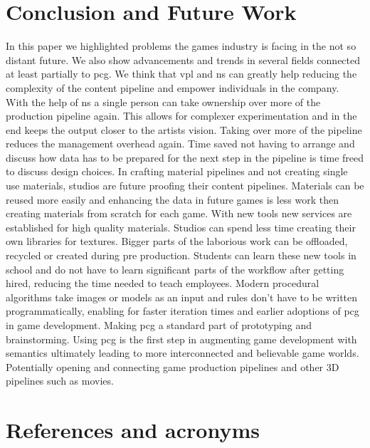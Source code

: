\documentclass[10pt,a4paper]{article}
\begin{document}
\section{Conclusion and Future Work}
\begin{multicols}{2}
In this paper we highlighted problems the games industry is facing in the not so distant future. We also show advancements and trends in several fields connected at least partially to \gls{pcg}. We think that \gls{vpl} and \gls{ns} can greatly help reducing the complexity of the content pipeline and empower individuals in the company. With the help of \gls{ns} a single person can take ownership over more of the production pipeline again. This allows for complexer experimentation and in the end keeps the output closer to the artists vision. Taking over more of the pipeline reduces the management overhead again. Time saved not having to arrange and discuss how data has to be prepared for the next step in the pipeline is time freed to discuss design choices. In crafting material pipelines and not creating single use materials, studios are future proofing their content pipelines. Materials can be reused more easily and enhancing the data in future games is less work then creating materials from scratch for each game. With new tools new services are established for high quality materials. Studios can spend less time creating their own libraries for textures. Bigger parts of the laborious work can be offloaded, recycled or created during pre production. Students can learn these new tools in school and do not have to learn significant parts of the workflow after getting hired, reducing the time needed to teach employees. Modern procedural algorithms take images or models as an input and rules don’t have to be written programmatically, enabling for faster iteration times and earlier adoptions of \gls{pcg} in game development. Making \gls{pcg} a standard part of prototyping and brainstorming. Using \gls{pcg} is the first step in augmenting game development with semantics ultimately leading to more interconnected and believable game worlds. Potentially opening and connecting game production pipelines and other 3D pipelines such as movies.
\end{multicols}

\section{References and acronyms}

\printglossaries


%
%

%


\listoffigures

\end{document}
